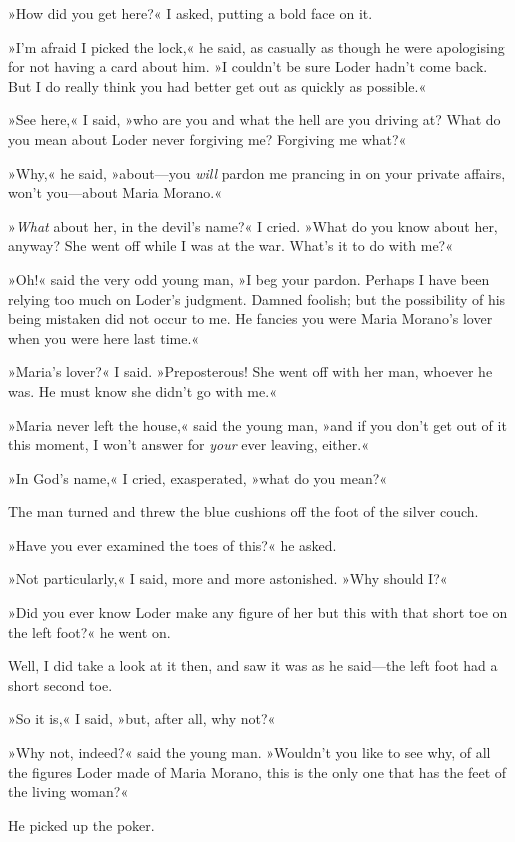 »How did you get here?« I asked, putting a bold face on it.

»I'm afraid I picked the lock,« he said, as casually as though he were apologising for not having a card about him. »I couldn't be sure Loder hadn't come back. But I do really think you had better get out as quickly as possible.«

»See here,« I said, »who are you and what the hell are you driving at? What do you mean about Loder never forgiving me? Forgiving me what?«

»Why,« he said, »about—you \textit{will} pardon me prancing in on your private affairs, won't you—about Maria Morano.«

»\textit{What} about her, in the devil's name?« I cried. »What do you know about her, anyway? She went off while I was at the war. What's it to do with me?«

»Oh!« said the very odd young man, »I beg your pardon. Perhaps I have been relying too much on Loder's judgment. Damned foolish; but the possibility of his being mistaken did not occur to me. He fancies you were Maria Morano's lover when you were here last time.«

»Maria's lover?« I said. »Preposterous! She went off with her man, whoever he was. He must know she didn't go with me.«

»Maria never left the house,« said the young man, »and if you don't get out of it this moment, I won't answer for \textit{your} ever leaving, either.«

»In God's name,« I cried, exasperated, »what do you mean?«

The man turned and threw the blue cushions off the foot of the silver couch.

»Have you ever examined the toes of this?« he asked.

»Not particularly,« I said, more and more astonished. »Why should I\@?«

»Did you ever know Loder make any figure of her but this with that short toe on the left foot?« he went on.

Well, I did take a look at it then, and saw it was as he said—the left foot had a short second toe.

»So it is,« I said, »but, after all, why not?«

»Why not, indeed?« said the young man. »Wouldn't you like to see why, of all the figures Loder made of Maria Morano, this is the only one that has the feet of the living woman?«

He picked up the poker.


